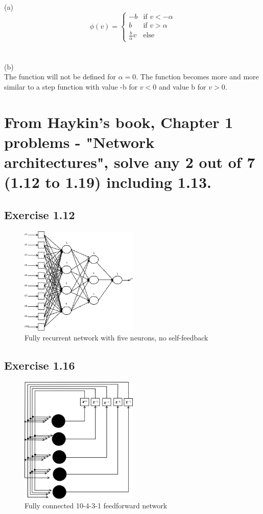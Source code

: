 \documentclass[paper=a4, fontsize=11pt]{scrartcl} %
\numberwithin{equation}{section} %
\numberwithin{figure}{section} %
\numberwithin{table}{section} %
\begin{document}
(a)\\
\[ \phi(v) =
\left\{
	\begin{array}{ll}
		-b  & \mbox{if } v < -\alpha \\
		b & \mbox{if } v > \alpha \\
		\frac{b}{\alpha}v & \mbox{else}
	\end{array}
\right.\]\\\\

(b)\\
The function will not be defined for $\alpha =0$. The function becomes more and more similar to a step function with value -b for $v<0$ and value b for $v>0$.

\section{From Haykin's book, Chapter 1 problems - "Network architectures", solve any 2 out of 7
(1.12 to 1.19) including 1.13.}

\subsection{Exercise 1.12}
\begin{figure}[ht]
	\centering
  \includegraphics[width=0.5\textwidth]{1_12.jpeg}
	\caption{Fully recurrent network with five neurons, no self-feedback}
	\label{fig1}
\end{figure}


\subsection{Exercise 1.16}
\begin{figure}[ht]
	\centering
  \includegraphics[width=0.5\textwidth]{1_16.png}
	\caption{Fully connected 10-4-3-1 feedforward network }
	\label{fig1}
\end{figure}
\end{document}
